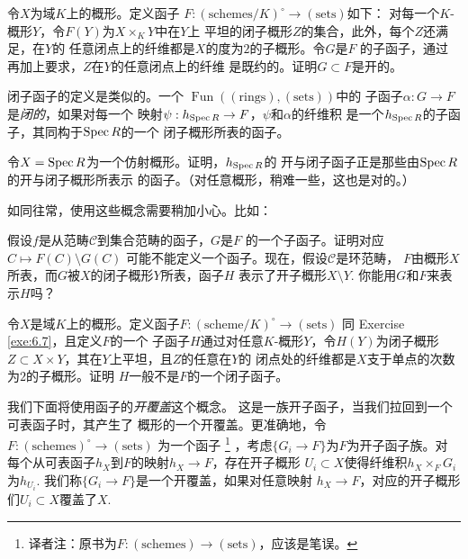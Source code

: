 \begin{exe} \label{exe:6.7}
令$X$为域$K$上的概形。定义函子
$F:(\text{schemes}/K)^\circ \to (\text{sets})$如下：
对每一个$K$-概形$Y$，令$F(Y)$为$X\times_K Y$中在$Y$上
平坦的闭子概形$Z$的集合，此外，每个$Z$还满足，在$Y$的
任意闭点上的纤维都是$X$的度为$2$的子概形。令$G$是$F$
的子函子，通过再加上要求，$Z$在$Y$的任意闭点上的纤维
是既约的。证明$G\subset F$是开的。
\end{exe}


闭子函子的定义是类似的。一个
$\operatorname{Fun}((\text{rings}),(\text{sets}))$中的
子函子$\alpha : G\to F$是\textit{闭的}，如果对每一个
映射$\psi:h_{\operatorname{Spec} R}\to F$，$\psi$和$\alpha$的纤维积
是一个$h_{\operatorname{Spec} R}$的子函子，其同构于$\operatorname{Spec} R$的一个
闭子概形所表的函子。

\begin{exe} \label{exe:6.8}
	令$X=\operatorname{Spec} R$为一个仿射概形。证明，$h_{\operatorname{Spec} R}$的
	开与闭子函子正是那些由$\operatorname{Spec} R$的开与闭子概形所表示
	的函子。（对任意概形，稍难一些，这也是对的。）
\end{exe}

如同往常，使用这些概念需要稍加小心。比如：

\begin{exe} \label{exe:6.9}
	假设$f$是从范畴$\mathscr C$到集合范畴的函子，$G$是$F$
	的一个子函子。证明对应$C\mapsto F(C)\setminus G(C)$
	可能不能定义一个函子。现在，假设$\mathscr C$是环范畴，
	$F$由概形$X$所表，而$G$被$X$的闭子概形$Y$所表，函子$H$
	表示了开子概形$X\setminus Y$. 你能用$G$和$F$来表示$H$吗？
\end{exe}

\begin{exe} \label{exe:6.10}
	令$X$是域$K$上的概形。定义函子$F:(\text{scheme}/K)^\circ
	\to (\text{sets})$
	同 Exercise \ref{exe:6.7}，且定义$F$的一个
	子函子$H$通过对任意$K$-概形$Y$，令$H(Y)$为闭子概形$Z
	\subset X\times Y$，其在$Y$上平坦，且$Z$的任意在$Y$的
	闭点处的纤维都是$X$支于单点的次数为$2$的子概形。证明
	$H$一般不是$F$的一个闭子函子。
\end{exe}

我们下面将使用函子的\textit{开覆盖}这个概念。
这是一族开子函子，当我们拉回到一个可表函子时，其产生了
概形的一个开覆盖。更准确地，令$F:(\text{schemes})^\circ
\to (\text{sets})$
为一个函子%
\footnote{译者注：原书为$F:(\text{schemes})
\to (\text{sets})$，应该是笔误。}%
，考虑$\{G_i\to F\}$为$F$为开子函子族。对
每个从可表函子$h_X$到$F$的映射$h_X\to F$，存在开子概形
$U_i\subset X$使得纤维积$h_X\times_F G_i$为$h_{U_i}$.
我们称$\{G_i\to F\}$是一个开覆盖，如果对任意映射
$h_X\to F$，对应的开子概形们$U_i\subset X$覆盖了$X$.

